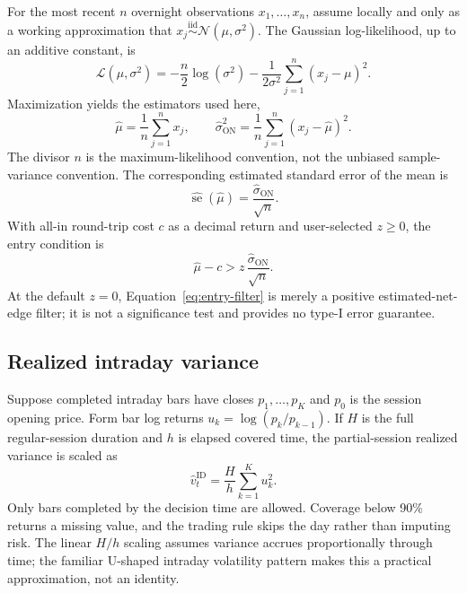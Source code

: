 \documentclass[11pt]{article}
\begin{document}
For the most recent $n$ overnight observations $x_1,\ldots,x_n$, assume locally and only as a
working approximation that $x_j\overset{\mathrm{iid}}{\sim}\mathcal N(\mu,\sigma^2)$. The
Gaussian log-likelihood, up to an additive constant, is
\begin{equation}
 \mathcal L(\mu,\sigma^2)
 =-\frac{n}{2}\log(\sigma^2)-\frac{1}{2\sigma^2}
 \sum_{j=1}^{n}(x_j-\mu)^2.
 \label{eq:likelihood}
\end{equation}
Maximization yields the estimators used here,
\begin{equation}
 \widehat{\mu}=\frac{1}{n}\sum_{j=1}^{n}x_j,
 \qquad
 \widehat{\sigma}_{\mathrm{ON}}^2
 =\frac{1}{n}\sum_{j=1}^{n}(x_j-\widehat{\mu})^2.
 \label{eq:mle}
\end{equation}
The divisor $n$ is the maximum-likelihood convention, not the unbiased sample-variance
convention. The corresponding estimated standard error of the mean is
\begin{equation}
 \widehat{\operatorname{se}}(\widehat{\mu})
 =\frac{\widehat{\sigma}_{\mathrm{ON}}}{\sqrt n}.
 \label{eq:se}
\end{equation}
With all-in round-trip cost $c$ as a decimal return and user-selected $z\geq 0$, the entry
condition is
\begin{equation}
 \widehat{\mu}-c>z\,
 \frac{\widehat{\sigma}_{\mathrm{ON}}}{\sqrt n}.
 \label{eq:entry-filter}
\end{equation}
At the default $z=0$, Equation~\eqref{eq:entry-filter} is merely a positive estimated-net-edge
filter; it is not a significance test and provides no type-I error guarantee.

\subsection{Realized intraday variance}

Suppose completed intraday bars have closes $p_1,\ldots,p_K$ and $p_0$ is the session opening
price. Form bar log returns $u_k=\log(p_k/p_{k-1})$. If $H$ is the full regular-session
duration and $h$ is elapsed covered time, the partial-session realized variance is scaled as
\begin{equation}
 \widehat v_{t}^{\mathrm{ID}}
 =\frac{H}{h}\sum_{k=1}^{K}u_k^2.
 \label{eq:rv}
\end{equation}
Only bars completed by the decision time are allowed. Coverage below 90\% returns a missing value,
and the trading rule skips the day rather than imputing risk. The linear $H/h$ scaling assumes
variance accrues proportionally through time; the familiar U-shaped intraday volatility pattern
makes this a practical approximation, not an identity.
\end{document}
